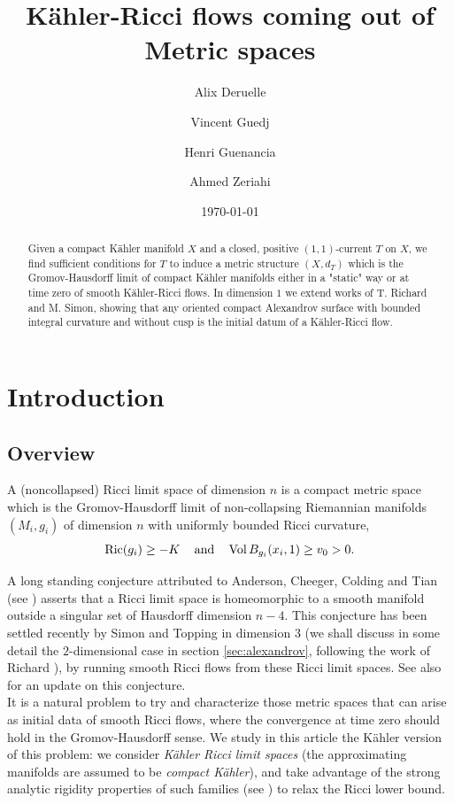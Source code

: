 \documentclass[a4paper,11pt,leqno,english]{smfart}
\title{K\"ahler-Ricci flows coming out of Metric spaces}
\date{\today}
\author{Alix Deruelle}
\author{Vincent Guedj}
\author{Henri Guenancia}
\author{Ahmed Zeriahi}
\theoremstyle{plain}
\theoremstyle{plain}
\numberwithin{equation}{section} %
\numberwithin{figure}{section} %
\theoremstyle{plain}
\theoremstyle{plain}
\theoremstyle{remark}
\theoremstyle{remark}
\theoremstyle{definition}
\theoremstyle{plain}
\theoremstyle{plain}
\theoremstyle{definition}
\begin{document}
 


\begin{abstract}  
Given a compact Kähler manifold $X$ and a closed, positive $(1,1)$-current $T$ on $X$, we find sufficient conditions for $T$ to induce a metric structure $(X,d_T)$ which is the Gromov-Hausdorff limit of compact Kähler manifolds either in a "static" way or at time zero of smooth K\"ahler-Ricci flows. In dimension $1$ we extend works of T. Richard and M. Simon, showing that any oriented compact Alexandrov surface with bounded integral curvature and without cusp is the initial datum of a K\"ahler-Ricci flow.
\end{abstract} 

\maketitle

\tableofcontents




\section{Introduction}

  
   \subsection{Overview}
  A (noncollapsed) Ricci limit space of dimension $n$
 is a compact metric space which is the Gromov-Hausdorff
limit of non-collapsing 
Riemannian manifolds $(M_i,g_i)$ of dimension $n$
 with uniformly bounded Ricci curvature,
$$
{\rm Ric}(g_i) \geq -K
\; \; \; \text{ and } \; \; \;
{\rm Vol} \, B_{g_i}(x_i,1) \geq v_0>0.
$$
  
   
   
  A long standing conjecture  attributed to Anderson, Cheeger, Colding and Tian  (see \cite{ChCo97})
  asserts that    a Ricci limit space is homeomorphic to a smooth manifold outside a singular set
   of Hausdorff dimension $n-4$. This conjecture has been settled 
   recently by Simon and Topping  \cite{Sim12,ST17} in dimension $3$
   (we shall discuss in some detail the $2$-dimensional case in section \ref{sec:alexandrov},
   following the work of Richard \cite{Rich18}), by 
running smooth Ricci flows from these Ricci limit spaces. See also \cite{Naber-Open-Pb} for an update on this conjecture.\\
   
   
   
    It is a natural problem  to try and characterize those  metric spaces that
   can arise as initial data of smooth Ricci flows, where
 the convergence at time zero should hold in the Gromov-Hausdorff sense.
We study in this article the K\"ahler version of this problem: we consider 
{\it K\"ahler Ricci limit spaces} (the approximating manifolds are assumed
to be {\it compact K\"ahler}),
and take advantage of the strong analytic rigidity properties of
such families (see \cite{DS14,DS17,LS18}) to relax the Ricci lower bound.
   
\end{document}

